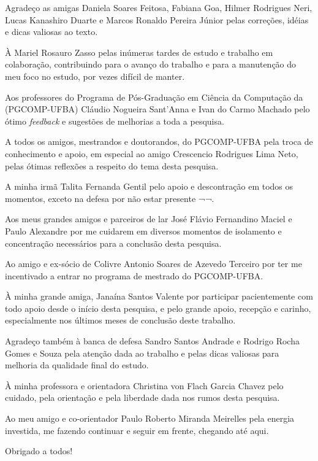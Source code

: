 Agradeço as amigas
Daniela Soares Feitosa,
Fabiana Goa,
Hilmer Rodrigues Neri,
Lucas Kanashiro Duarte e
Marcos Ronaldo Pereira Júnior
pelas correções, idéias e dicas valiosas ao texto.

À
Mariel Rosauro Zasso
pelas inúmeras tardes de estudo e trabalho em colaboração, contribuindo para o
avanço do trabalho e para a manutenção do meu foco no estudo, por vezes difícil
de manter.

Aos professores do Programa de Pós-Graduação em Ciência da Computação da (PGCOMP-UFBA)
Cláudio Nogueira Sant'Anna e
Ivan do Carmo Machado
pelo ótimo {\it feedback} e sugestões de melhorias a toda a pesquisa.

A todos os amigos, mestrandos e doutorandos, do PGCOMP-UFBA pela troca de
conhecimento e apoio, em especial ao amigo Crescencio Rodrigues Lima Neto,
pelas ótimas reflexões a respeito do tema desta pesquisa.

A minha irmã
Talita Fernanda Gentil
pelo apoio e descontração em todos os momentos, exceto na defesa por não estar
presente ¬¬.

Aos meus grandes amigos e parceiros de lar
José Flávio Fernandino Maciel e
Paulo Alexandre
por me cuidarem em diversos momentos de isolamento e concentração necessários para
a conclusão desta pesquisa.

Ao amigo e ex-sócio de Colivre
Antonio Soares de Azevedo Terceiro
por ter me incentivado a entrar no programa de mestrado do PGCOMP-UFBA.

À minha grande amiga,
Janaína Santos Valente
por participar pacientemente com todo apoio desde o início desta pesquisa, e
pelo grande apoio, recepção e carinho, especialmente nos últimos meses de
conclusão deste trabalho.

Agradeço também à banca de defesa
Sandro Santos Andrade e
Rodrigo Rocha Gomes e Souza
pela atenção dada ao trabalho e pelas dicas valiosas para melhoria da qualidade
final do estudo.

À minha professora e orientadora
Christina von Flach Garcia Chavez
pelo cuidado, pela orientação e pela liberdade dada nos rumos desta pesquisa.

Ao meu amigo e co-orientador
Paulo Roberto Miranda Meirelles
pela energia investida, me fazendo continuar e seguir em frente, chegando até
aqui.

Obrigado a todos!

